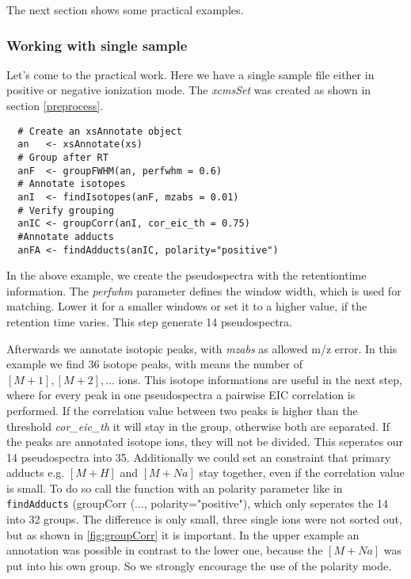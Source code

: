 \documentclass[a4paper,12pt]{article}
\newcommand{\Rfunction}[1]{{\texttt{#1}}}
\newcommand{\Rclass}[1]{{\textit{#1}}}
\newcommand{\Rfunarg}[1]{{\textit{#1}}}
\begin{document}
The next section shows some practical examples.

\subsubsection{Working with single sample}
Let's come to the practical work. Here we have a single sample file either in
positive or negative ionization mode.
The \Rclass{xcmsSet} was created as shown in section \ref{preprocess}.

\begin{verbatim}
  # Create an xsAnnotate object
  an   <- xsAnnotate(xs)
  # Group after RT
  anF  <- groupFWHM(an, perfwhm = 0.6)
  # Annotate isotopes
  anI  <- findIsotopes(anF, mzabs = 0.01)
  # Verify grouping
  anIC <- groupCorr(anI, cor_eic_th = 0.75)
  #Annotate adducts
  anFA <- findAdducts(anIC, polarity="positive")
 \end{verbatim}

In the above example, we create the pseudospectra with the retentiontime
information. The \Rfunarg{perfwhm} parameter defines the window width, which is
used for matching. Lower it for a smaller windows or set it to a  higher value,
if the retention time varies. This step generate 14 pseudospectra.

Afterwards we annotate isotopic peaks, with \Rfunarg{mzabs} as allowed m/z
error. In this example we find 36 isotope peaks, with means the number of
$[M+1],[M+2],\ldots$ ions. This isotope informations are useful in the next step,
where for every peak in one pseudospectra a pairwise EIC correlation is performed. If
the correlation value between two peaks is higher than the threshold
\Rfunarg{cor\_eic\_th} it will stay in the group, otherwise both are separated.
If the peaks are annotated isotope ions, they will not be divided. This seperates
our 14 pseudospectra into 35.
Additionally we could set an constraint that primary adducts e.g. $[M+H]$
and $[M+Na]$ stay together, even if the correlation value is small. To do so
call the function with an polarity parameter like in \Rfunction{findAdducts}
(groupCorr (..., polarity="positive"), which only seperates the 14 into 32
groups. The difference is only small, three single ions were not sorted out,
but as shown in \ref{fig:groupCorr} it is important. In the upper
example an annotation was possible in contrast to the lower one, because the
$[M+Na]$ was put into his own group. So we strongly encourage the use of the
polarity mode.
\end{document}
